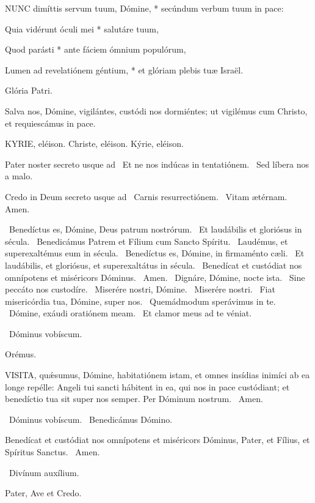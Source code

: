\lettrine[lines=2]{N}{UNC} dimíttis servum tuum, Dómine, * secúndum verbum tuum in pace:

Quia vidérunt óculi mei * salutáre tuum,

Quod parásti * ante fáciem ómnium populórum,

Lumen ad revelatiónem géntium, * et glóriam plebis tuæ Israël.

Glória Patri.

 Salva nos, Dómine, vigilántes, custódi nos dormiéntes; ut vigilémus cum Christo, et requiescámus in pace.


KYRIE, eléison. Christe, eléison. Kýrie, eléison.

Pater noster secreto usque ad \V\ Et ne nos indúcas in tentatiónem. \R\ Sed líbera nos a malo.

Credo in Deum secreto usque ad \V\ Carnis resurrectiónem. \R\ Vitam ætérnam. Amen.

\V\ Benedíctus es, Dómine, Deus patrum nostrórum. \R\ Et laudábilis et gloriósus in sécula. \V\ Benedicámus Patrem et Fílium cum Sancto Spíritu. \R\ Laudémus, et superexaltémus eum in sécula. \V\ Benedíctus es, Dómine, in firmaménto cæli. \R\ Et laudábilis, et gloriósus, et superexaltátus in sécula. \V\ Benedícat et custódiat nos omnípotens et miséricors Dóminus. \R\ Amen. \V\ Dignáre, Dómine, nocte ista. \R\ Sine peccáto nos custodíre. \V\ Miserére nostri, Dómine. \R\ Miserére nostri. \V\ Fiat misericórdia tua, Dómine, super nos. \R\ Quemádmodum sperávimus in te. \V\ Dómine, exáudi oratiónem meam. \R\ Et clamor meus ad te véniat.

\V\ Dóminus vobíscum.

Orémus. 

\lettrine[lines=2]{V}{ISITA}, quǽsumus, Dómine, habitatiónem istam, et omnes insídias inimíci ab ea longe repélle: Angeli tui sancti hábitent in ea, qui nos in pace custódiant; et benedíctio tua sit super nos semper. Per Dóminum nostrum. \R\ Amen.

\V\ Dóminus vobíscum. \V\ Benedicámus Dómino.

 Benedícat et custódiat nos omnípotens et miséricors Dóminus, Pater, et Fílius, et Spíritus Sanctus. \R\ Amen.


\V\ Divínum auxílium.

Pater, Ave et Credo.

